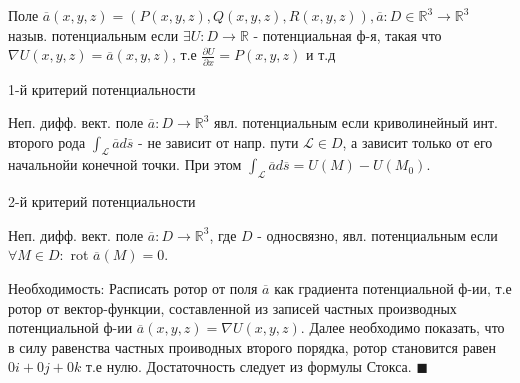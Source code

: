 \documentclass[unicode,10pt, landscape]{article}
\newenvironment{Proof} %
{\par\noindent{\bf Док-во:}} %
{\hfill$\scriptstyle\blacksquare$}
\begin{document}
\begin{multicols}{2}
\begin{Def}
	Поле $\overline{a}(x, y, z) = (P(x, y, z), Q(x, y, z), R(x, y, z)), \overline{a} : D \in \mathbb{R}^3 \to \mathbb{R}^3$ назыв. потенциальным если $\exists U: D \to \mathbb{R}$ - потенциальная ф-я, такая что $\nabla U(x, y, z) = \overline{a}(x, y, z)$, т.е $\frac{\partial U}{\partial x} = P(x, y, z)$ и т.д
\end{Def}
1-й критерий потенциальности
\begin{Th}
	Неп. дифф. вект. поле $\overline{a}: D \to \mathbb{R}^3$ явл. потенциальным если криволинейный инт. второго рода $\int_{\mathcal{L}}\overline{a}d\overline{s}$ - не зависит от напр. пути $\mathcal{L} \in D$, а зависит только от его начальнойи конечной точки. При этом $\int_{\mathcal{L}}\overline{a}d\overline{s} = U(M) - U(M_0)$.
\end{Th}
2-й критерий потенциальности
\begin{Th}
	Неп. дифф. вект. поле $\overline{a}: D \to \mathbb{R}^3$, где $D$ - односвязно, явл. потенциальным если $\forall M \in D: $ rot $\overline{a}(M) = 0$.
	\begin{Proof}
		Необходимость: Расписать ротор от поля $\overline{a}$ как градиента потенциальной ф-ии, т.е ротор от вектор-функции, составленной из записей частных производных потенциальной ф-ии $\overline{a}(x, y, z) = \nabla U(x, y, z)$. Далее необходимо показать, что в силу равенства частных проиводных второго порядка, ротор становится равен $0i + 0j + 0k$ т.е нулю.
		Достаточность следует из формулы Стокса.
	\end{Proof}
\end{Th}


\end{multicols}
\end{document}
